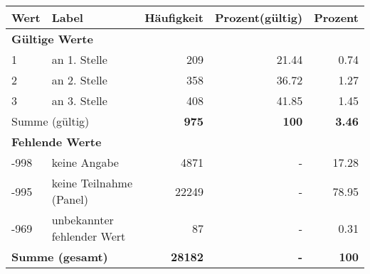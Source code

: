      \begin{longtable}{lXrrr}
     \toprule
     \textbf{Wert} & \textbf{Label} & \textbf{Häufigkeit} & \textbf{Prozent(gültig)} & \textbf{Prozent} \\
     \endhead
     \midrule
     \multicolumn{5}{l}{\textbf{Gültige Werte}}\\

     1 &
     \multicolumn{1}{X}{ an 1. Stelle   } &


       \num{209} &
       \num[round-mode=places,round-precision=2]{21,44} &
         \num[round-mode=places,round-precision=2]{0,74} \\

     2 &
     \multicolumn{1}{X}{ an 2. Stelle   } &


       \num{358} &
       \num[round-mode=places,round-precision=2]{36,72} &
         \num[round-mode=places,round-precision=2]{1,27} \\

     3 &
     \multicolumn{1}{X}{ an 3. Stelle   } &


       \num{408} &
       \num[round-mode=places,round-precision=2]{41,85} &
         \num[round-mode=places,round-precision=2]{1,45} \\
     \midrule
     \multicolumn{2}{l}{Summe (gültig)} &
       \textbf{\num{975}} &
     \textbf{100} &
       \textbf{\num[round-mode=places,round-precision=2]{3,46}} \\
     \multicolumn{5}{l}{\textbf{Fehlende Werte}}\\
       -998 &
       keine Angabe &
         \num{4871} &
        - &
         \num[round-mode=places,round-precision=2]{17,28} \\
       -995 &
       keine Teilnahme (Panel) &
         \num{22249} &
        - &
         \num[round-mode=places,round-precision=2]{78,95} \\
       -969 &
       unbekannter fehlender Wert &
         \num{87} &
        - &
         \num[round-mode=places,round-precision=2]{0,31} \\
     \midrule
     \multicolumn{2}{l}{\textbf{Summe (gesamt)}} &
          \textbf{\num{28182}} &
        \textbf{-} &
        \textbf{100} \\
     \bottomrule
     \end{longtable}
     
